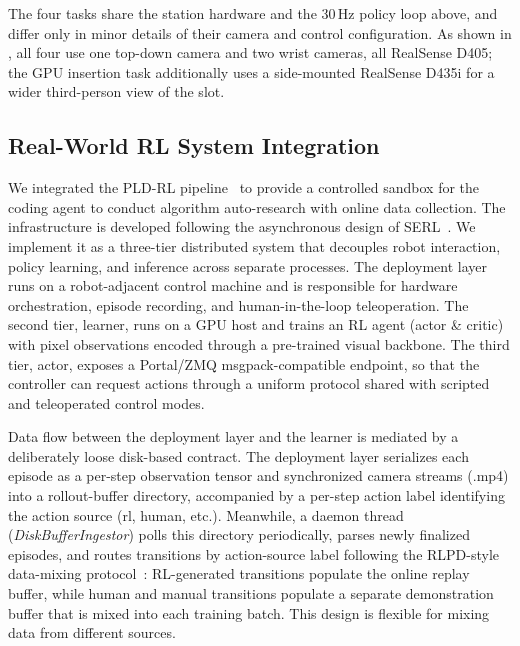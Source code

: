 The four tasks share the station hardware and the 30\,Hz policy loop above, and differ only in minor details of their camera and control configuration. As shown in , all four use one top-down camera and two wrist cameras, all RealSense D405; the GPU insertion task additionally uses a side-mounted RealSense D435i for a wider third-person view of the slot.


\subsection{Real-World RL System Integration}
We integrated the PLD-RL pipeline~\cite{pld} to provide a controlled sandbox for the coding agent to conduct algorithm auto-research with online data collection. The infrastructure is developed following the asynchronous design of SERL~\citep{luo2024serl, luo2025precise}. We implement it as a three-tier distributed system that decouples robot interaction, policy learning, and inference across separate processes. The deployment layer runs on a robot-adjacent control machine and is responsible for hardware orchestration, episode recording, and human-in-the-loop teleoperation. The second tier, learner, runs on a GPU host and trains an RL agent (actor \& critic) with pixel observations encoded through a pre-trained visual backbone. The third tier, actor, exposes a Portal/ZMQ msgpack-compatible endpoint, so that the controller can request actions through a uniform protocol shared with scripted and teleoperated control modes.


Data flow between the deployment layer and the learner is mediated by a deliberately loose disk-based contract. The deployment layer serializes each episode as a per-step observation tensor and synchronized camera streams (.mp4) into a rollout-buffer directory, accompanied by a per-step action label identifying the action source (rl, human, etc.). Meanwhile, a daemon thread (\textit{DiskBufferIngestor}) polls this directory periodically, parses newly finalized episodes, and routes transitions by action-source label following the RLPD-style data-mixing protocol~\citep{rlpd}: RL-generated transitions populate the online replay buffer, while human and manual transitions populate a separate demonstration buffer that is mixed into each training batch. This design is flexible for mixing data from different sources.

